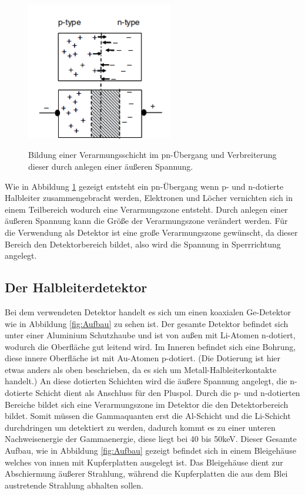 \begin{figure}[H]
  \centering
  \includegraphics[height=6cm]{pn.png}
  \caption{Bildung einer Verarmungsschicht im pn-Übergang und Verbreiterung dieser durch
  anlegen einer äußeren Spannung.}
  \label{fig:pn}
  \cite{Gilmore2}
\end{figure}

Wie in Abbildung \ref{fig:pn} gezeigt entsteht ein pn-Übergang wenn p- und n-dotierte Halbleiter zusammengebracht werden,
Elektronen und Löcher vernichten sich in einem Teilbereich wodurch eine Verarmungszone entsteht.
Durch anlegen einer äußeren Spannung kann die Größe der Verarmungszone verändert werden. Für die
Verwendung als Detektor ist eine große Verarmungszone gewünscht, da dieser Bereich den
Detektorbereich bildet, also wird die Spannung in Sperrrichtung angelegt.


\subsection{Der Halbleiterdetektor}
Bei dem verwendeten Detektor handelt es sich um einen koaxialen Ge-Detektor wie in Abbildung
\ref{fig:Aufbau} zu sehen ist. Der gesamte Detektor befindet sich unter einer Aluminium
Schutzhaube und ist von außen mit Li-Atomen n-dotiert, wodurch die Oberfläche
gut leitend wird. Im Inneren befindet sich eine Bohrung, diese innere Oberfläche ist
mit Au-Atomen p-dotiert. (Die Dotierung ist hier etwas anders als oben beschrieben, da es sich um
Metall-Halbleiterkontakte handelt.) An diese dotierten Schichten wird die
äußere Spannung angelegt, die n-dotierte Schicht dient als Anschluss für den Pluspol.
Durch die p- und n-dotierten Bereiche bildet sich eine
Verarmungszone im Detektor die den Detektorbereich bildet. Somit müssen die Gammaquanten erst
die Al-Schicht und die Li-Schicht durchdringen um detektiert zu werden, dadurch kommt es zu einer
unteren Nachweisenergie der Gammaenergie, diese liegt bei 40 bis 50\;keV.
Dieser Gesamte Aufbau, wie in Abbildung \ref{fig:Aufbau} gezeigt befindet sich in einem
Bleigehäuse welches von innen mit Kupferplatten ausgelegt ist. Das Bleigehäuse dient zur Abschiermung
äußerer Strahlung, während die Kupferplatten die aus dem Blei austretende Strahlung
abhalten sollen.

